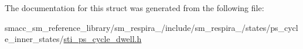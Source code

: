 The documentation for this struct was generated from the following file\+:\begin{DoxyCompactItemize}
\item 
smacc\+\_\+sm\+\_\+reference\+\_\+library/sm\+\_\+respira\+\_/include/sm\+\_\+respira\+\_/states/ps\+\_\+cycle\+\_\+inner\+\_\+states/\hyperlink{sti__ps__cycle__dwell_8h}{sti\+\_\+ps\+\_\+cycle\+\_\+dwell.\+h}\end{DoxyCompactItemize}

